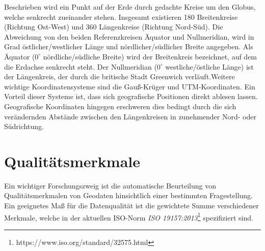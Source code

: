 \documentclass[11pt,ceqn]{book}
\begin{document}
Beschrieben wird ein Punkt auf der Erde durch gedachte Kreise um den Globus, welche senkrecht zueinander stehen. Insgesamt existieren 180 Breitenkreise (Richtung Ost-West) und 360 Längenkreise (Richtung Nord-Süd). Die Abweichung von den beiden Referenzkreisen Äquator und Nullmeridian, wird in Grad östlicher/westlicher Länge und nördlicher/südlicher Breite angegeben. Als Äquator ($0^\circ$ nördliche/südliche Breite) wird der Breitenkreis bezeichnet, auf dem die Erdachse senkrecht steht. Der Nullmeridian ($0^\circ$ westliche/östliche Länge) ist der Längenkreis, der durch die britische Stadt Greenwich verläuft.\newline Weitere wichtige Koordinatensysteme sind die Gauß-Krüger und UTM-Koordinaten. Ein Vorteil dieser Systeme ist, dass sich geografische Positionen direkt ablesen lassen. Geografische Koordinaten hingegen erschweren dies bedingt durch die sich verändernden Abstände zwischen den Längenkreisen in zunehmender Nord- oder Südrichtung.


\section{Qualitätsmerkmale}
Ein wichtiger Forschungszweig ist die automatische Beurteilung von Qualitätsmerkmalen von Geodaten hinsichtlich einer bestimmten Fragestellung.
Ein geeignetes Maß für die Datenqualität ist die gewichtete Summe verschiedener Merkmale, welche in der aktuellen ISO-Norm \textit{ISO 19157:2013}\footnote{https://www.iso.org/standard/32575.html} spezifiziert sind.
\end{document}
